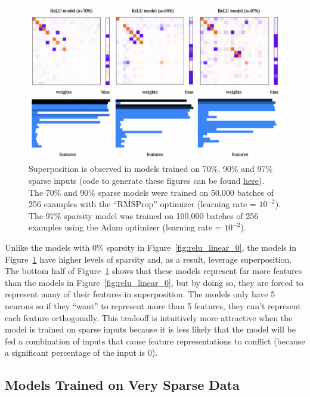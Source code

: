 \documentclass{article} %
\begin{document}
\begin{figure}[h]
    \centering
    \includegraphics[width=0.75\linewidth]{demonstrating_superposition/images/sparsity_superposition1.png}
    \captionsetup{font=footnotesize, width=0.71\linewidth} %
    \caption{
        Superposition is observed in models trained on 70\%, 90\% and 97\% 
        sparse inputs (code to generate these figures can be found 
        \href{https://github.com/zroe1/toy_models_of_superposition/blob/main/section_1/section_1.ipynb}{here}). 
        The 70\% and 90\% sparse models were trained on 50,000 batches of 256 
        examples with the ``RMSProp'' optimizer (learning rate = $10^{-2}$). The 
        97\% sparsity model was trained on 100,000 batches of 256 examples using 
        the Adam optimizer (learning rate = $10^{-2}$).
    }
    \label{fig:sparsity_1}
\end{figure}

Unlike the models with 0\% sparsity in Figure~\ref{fig:relu_linear_0}, the models
in Figure~\ref{fig:sparsity_1} have higher levels of sparsity and, as
a result, leverage superposition. The bottom half of Figure~\ref{fig:sparsity_1}
shows that these models represent far more features than the models in
Figure~\ref{fig:relu_linear_0}, but by doing so, they are forced to represent many 
of their features in superposition. The models only have 5 neurons so if they 
``want'' to represent more than 5 features, they can't represent each feature 
orthogonally. This tradeoff is intuitively more attractive when the model is
trained on sparse inputs because it is less likely that the model will be fed
a combination of inputs that cause feature representations to conflict (because
a significant percentage of the input is 0).


\subsection{Models Trained on Very Sparse Data}
\end{document}
